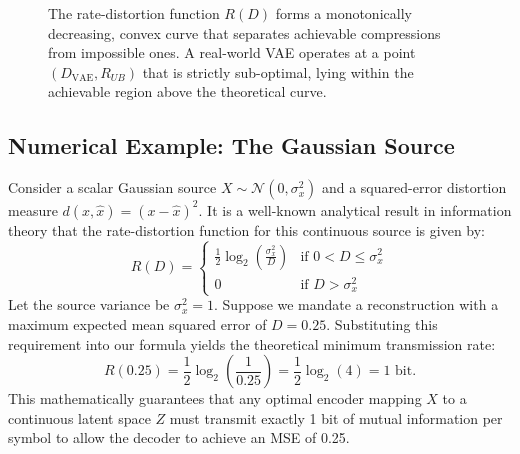 \begin{figure}[htbp]
\centering
{}
\caption{The rate-distortion function $R(D)$ forms a monotonically decreasing, convex curve that separates achievable compressions from impossible ones. A real-world VAE operates at a point $(D_{\text{VAE}}, R_{UB})$ that is strictly sub-optimal, lying within the achievable region above the theoretical curve.}
\label{fig:rd_curve2}
\end{figure}

\subsection*{Numerical Example: The Gaussian Source}
Consider a scalar Gaussian source $X \sim \mathcal{N}(0, \sigma_x^2)$ and a squared-error distortion measure $d(x, \hat{x}) = (x - \hat{x})^2$. It is a well-known analytical result in information theory that the rate-distortion function for this continuous source is given by:
\begin{equation}
    R(D) = 
    \begin{cases} 
      \frac{1}{2} \log_2 \left( \frac{\sigma_x^2}{D} \right) & \text{if } 0 < D \le \sigma_x^2 \\
      0 & \text{if } D > \sigma_x^2
    \end{cases}
\end{equation}
Let the source variance be $\sigma_x^2 = 1$. Suppose we mandate a reconstruction with a maximum expected mean squared error of $D = 0.25$. Substituting this requirement into our formula yields the theoretical minimum transmission rate:
\begin{equation}
    R(0.25) = \frac{1}{2} \log_2\left(\frac{1}{0.25}\right) = \frac{1}{2} \log_2(4) = 1 \text{ bit}.
\end{equation}
This mathematically guarantees that any optimal encoder mapping $X$ to a continuous latent space $Z$ must transmit exactly 1 bit of mutual information per symbol to allow the decoder to achieve an MSE of 0.25. 

